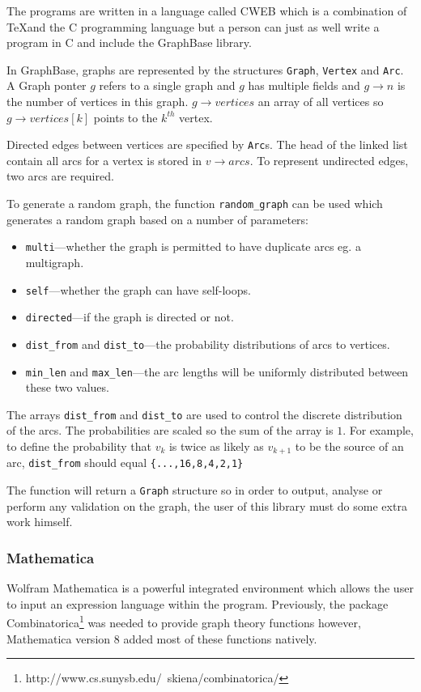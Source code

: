 \documentclass{article}
\newcommand{\code}[1]{\texttt{#1}}
\begin{document}
    The programs are written in a language called CWEB which is a combination of \TeX and the C programming language but a person can just as well write a program in C and include the GraphBase library. 

    In GraphBase, graphs are represented by the structures \code{Graph}, \code{Vertex} and \code{Arc}. A Graph ponter $g$ refers to a single graph and $g$ has multiple fields and $g \to n$ is the number of vertices in this graph. $g \to vertices$ an array of all vertices so $g \to vertices[k]$ points to the $k^{th}$ vertex.

    Directed edges between vertices are specified by \code{Arc}s. The head of the linked list contain all arcs for a vertex is stored in $v \to arcs$. To represent undirected edges, two arcs are required. 

    To generate a random graph, the function \code{random\_graph} can be used which generates a random graph based on a number of parameters:

    \begin{itemize}
    \item \code{multi}---whether the graph is permitted to have duplicate arcs eg. a multigraph.
    \item \code{self}---whether the graph can have self-loops.
    \item \code{directed}---if the graph is directed or not.
    \item \code{dist\_from} and \code{dist\_to}---the probability distributions of arcs to vertices.
    \item \code{min\_len} and \code{max\_len}---the arc lengths will be uniformly distributed between these two values.
    \end{itemize}

    The arrays \code{dist\_from} and \code{dist\_to} are used to control the discrete distribution of the arcs. The probabilities are scaled so the sum of the array is $1$. For example, to define the probability that $v_k$ is twice as likely as $v_{k+1}$ to be the source of an arc, \code{dist\_from} should equal \code{\{...,16,8,4,2,1\}}

    The function will return a \code{Graph} structure so in order to output, analyse or perform any validation on the graph, the user of this library must do some extra work himself.

  \subsubsection{Mathematica}
    Wolfram Mathematica is a powerful integrated environment which allows the user to input an expression language within the program. Previously, the package Combinatorica\footnote{http://www.cs.sunysb.edu/~skiena/combinatorica/} was needed to provide graph theory functions however, Mathematica version 8 added most of these functions natively.
\end{document}
